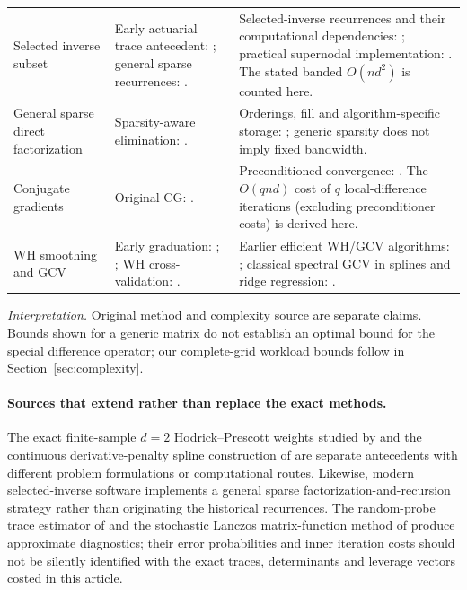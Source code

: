 \begin{table}
\begin{tabularx}{0.94\textheight}{@{}p{0.18\textheight}p{0.31\textheight}X@{}}
\addlinespace
Selected inverse subset &
Early actuarial trace antecedent:
\citet{spoerl1943}; general sparse
recurrences: \citet{takahashi1973,erisman1975}. &
Selected-inverse recurrences and their computational
dependencies: \citet{erisman1975}; practical
supernodal implementation: \citet{lin2011}.
The stated banded $O(nd^2)$ is counted here.\\
\addlinespace
General sparse direct factorization &
Sparsity-aware elimination:
\citet{markowitz1957}. &
Orderings, fill and algorithm-specific storage:
\citet{davis2006}; generic sparsity does
not imply fixed bandwidth.\\
\addlinespace
Conjugate gradients &
Original CG: \citet{hestenesstiefel1952}. &
Preconditioned convergence: \citet{saad2003}.
The $O(qnd)$ cost of $q$ local-difference
iterations (excluding preconditioner costs)
is derived here.\\
\addlinespace
WH smoothing and GCV &
Early graduation: \citet{bohlmann1899};
\citet{whittaker1923}; WH cross-validation:
\citet{brooks1988}. &
Earlier efficient WH/GCV algorithms:
\citet{weinert2007}; classical spectral
GCV in splines and ridge regression:
\citet{craven1979,golub1979}.\\
\bottomrule
\end{tabularx}

\vspace{8pt}
\begin{minipage}{0.94\textheight}
\small\emph{Interpretation.} Original method and complexity
source are separate claims. Bounds shown for a generic matrix
do not establish an optimal bound for the special difference
operator; our complete-grid workload bounds follow in
Section~\ref{sec:complexity}.
\end{minipage}
\end{table}




\paragraph{Sources that extend rather than replace the exact methods.}
The exact finite-sample $d=2$ Hodrick--Prescott
weights studied by \citet{corneamadeira2017}
and the continuous derivative-penalty spline
construction of \citet{reinsch1967}
are separate antecedents with different
problem formulations or computational routes.
Likewise, modern selected-inverse software
\citep{lin2011} implements a general sparse
factorization-and-recursion strategy rather
than originating the historical
\citet{erisman1975} recurrences. The
random-probe trace estimator of
\citet{hutchinson1990} and the
stochastic Lanczos matrix-function method of
\citet{ubaru2017} produce approximate
diagnostics; their error probabilities and
inner iteration costs should not be silently
identified with the exact traces,
determinants and leverage vectors
costed in this article.

